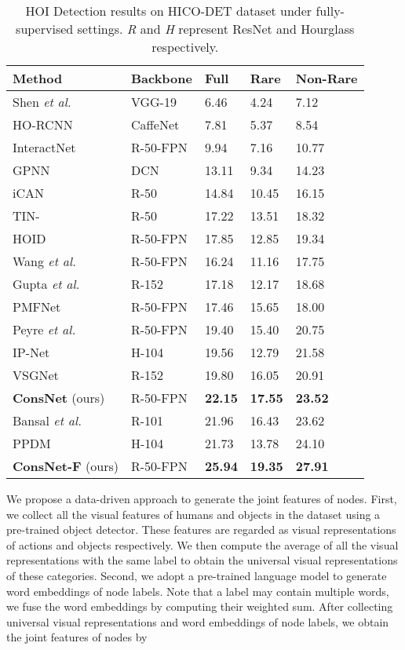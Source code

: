 \documentclass[sigconf,screen]{acmart}
\begin{document}
\begin{table}
\renewcommand\tabcolsep{4pt}
\caption{HOI Detection results on HICO-DET dataset under fully-supervised settings. \textit{R} and \textit{H} represent ResNet and Hourglass respectively.}
\label{tab:2}
\begin{tabularx}{\linewidth}{p{2.4cm}<{\raggedright}|p{1.45cm}<{\raggedright}|p{1cm}<{\centering}p{1cm}<{\centering}p{1cm}<{\centering}p{1cm}<{\centering}}
\toprule
\textbf{Method}&\textbf{Backbone}&\textbf{Full}&\textbf{Rare}&\multicolumn{2}{l}{\hspace{-0.15cm}\textbf{Non-Rare}}\\
\midrule
Shen \textit{et al.} \cite{shen2018scaling}&VGG-19&6.46&4.24&7.12\\
HO-RCNN \cite{chao2018learning}&CaffeNet&7.81&5.37&8.54\\
InteractNet \cite{gkioxari2018detecting}&R-50-FPN&9.94&7.16&10.77\\
GPNN \cite{qi2018learning}&DCN&13.11&9.34&14.23\\
iCAN \cite{gao2018ican}&R-50&14.84&10.45&16.15\\
TIN- \cite{li2019transferable}&R-50&17.22&13.51&18.32\\
HOID \cite{wang2020discovering}&R-50-FPN&17.85&12.85&19.34\\
Wang \textit{et al.} \cite{wang2019deep}&R-50-FPN&16.24&11.16&17.75\\
Gupta \textit{et al.} \cite{gupta2019no}&R-152&17.18&12.17&18.68\\
PMFNet \cite{wan2019pose}&R-50-FPN&17.46&15.65&18.00\\
Peyre \textit{et al.} \cite{peyre2019detecting}&R-50-FPN&19.40&15.40&20.75\\
IP-Net \cite{wang2020learning}&H-104&19.56&12.79&21.58\\
VSGNet \cite{ulutan2020vsgnet}&R-152&19.80&16.05&20.91\\
\textbf{ConsNet} (ours)&R-50-FPN&\textbf{22.15}&\textbf{17.55}&\textbf{23.52}\\
\midrule
Bansal \textit{et al.} \cite{bansal2019detecting}&R-101&21.96&16.43&23.62\\
PPDM \cite{liao2020ppdm}&H-104&21.73&13.78&24.10\\
\textbf{ConsNet-F} (ours)&R-50-FPN&\textbf{25.94}&\textbf{19.35}&\textbf{27.91}\\
\bottomrule
\end{tabularx}
\end{table}

We propose a data-driven approach to generate the joint features of nodes. First, we collect all the visual features of humans and objects in the dataset using a pre-trained object detector. These features are regarded as visual representations of actions and objects respectively. We then compute the average of all the visual representations with the same label to obtain the universal visual representations of these categories. Second, we adopt a pre-trained language model to generate word embeddings of node labels. Note that a label may contain multiple words, we fuse the word embeddings by computing their weighted sum. After collecting universal visual representations and word embeddings of node labels, we obtain the joint features of nodes by
\end{document}

